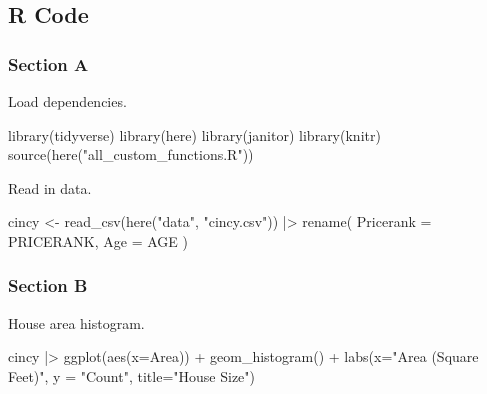 \documentclass[
  letterpaper,
  DIV=11,
  numbers=noendperiod]{scrartcl}
\newenvironment{Shaded}{\begin{snugshade}}{\end{snugshade}}
\newcommand{\AttributeTok}[1]{\textcolor[rgb]{0.40,0.45,0.13}{#1}}
\newcommand{\FunctionTok}[1]{\textcolor[rgb]{0.28,0.35,0.67}{#1}}
\newcommand{\NormalTok}[1]{\textcolor[rgb]{0.00,0.23,0.31}{#1}}
\newcommand{\OtherTok}[1]{\textcolor[rgb]{0.00,0.23,0.31}{#1}}
\newcommand{\SpecialCharTok}[1]{\textcolor[rgb]{0.37,0.37,0.37}{#1}}
\newcommand{\StringTok}[1]{\textcolor[rgb]{0.13,0.47,0.30}{#1}}
\begin{document}
\hypertarget{r-code}{%
\subsection{R Code}\label{r-code}}

\hypertarget{section-a}{%
\subsubsection{Section A}\label{section-a}}

Load dependencies.

\begin{Shaded}
\begin{Highlighting}[]
\FunctionTok{library}\NormalTok{(tidyverse)}
\FunctionTok{library}\NormalTok{(here)}
\FunctionTok{library}\NormalTok{(janitor)}
\FunctionTok{library}\NormalTok{(knitr)}
\FunctionTok{source}\NormalTok{(}\FunctionTok{here}\NormalTok{(}\StringTok{"all\_custom\_functions.R"}\NormalTok{))}
\end{Highlighting}
\end{Shaded}

Read in data.

\begin{Shaded}
\begin{Highlighting}[]
\NormalTok{cincy }\OtherTok{\textless{}{-}} \FunctionTok{read\_csv}\NormalTok{(}\FunctionTok{here}\NormalTok{(}\StringTok{"data"}\NormalTok{, }\StringTok{"cincy.csv"}\NormalTok{)) }\SpecialCharTok{|\textgreater{}}
  \FunctionTok{rename}\NormalTok{(}
    \AttributeTok{Pricerank =}\NormalTok{ PRICERANK,}
    \AttributeTok{Age =}\NormalTok{ AGE}
\NormalTok{  )}
\end{Highlighting}
\end{Shaded}

\hypertarget{section-b}{%
\subsubsection{Section B}\label{section-b}}

House area histogram.

\begin{Shaded}
\begin{Highlighting}[]
\NormalTok{cincy }\SpecialCharTok{|\textgreater{}} \FunctionTok{ggplot}\NormalTok{(}\FunctionTok{aes}\NormalTok{(}\AttributeTok{x=}\NormalTok{Area)) }\SpecialCharTok{+} \FunctionTok{geom\_histogram}\NormalTok{() }\SpecialCharTok{+} 
  \FunctionTok{labs}\NormalTok{(}\AttributeTok{x=}\StringTok{"Area (Square Feet)"}\NormalTok{, }\AttributeTok{y =} \StringTok{"Count"}\NormalTok{, }\AttributeTok{title=}\StringTok{"House Size"}\NormalTok{)}
\end{Highlighting}
\end{Shaded}
\end{document}
